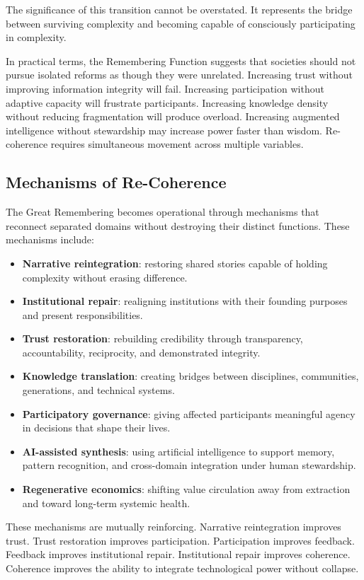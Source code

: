 \documentclass[12pt]{article}
\begin{document}
The significance of this transition cannot be overstated. It represents the bridge between surviving complexity and becoming capable of consciously participating in complexity.

In practical terms, the Remembering Function suggests that societies should not pursue isolated reforms as though they were unrelated. Increasing trust without improving information integrity will fail. Increasing participation without adaptive capacity will frustrate participants. Increasing knowledge density without reducing fragmentation will produce overload. Increasing augmented intelligence without stewardship may increase power faster than wisdom. Re-coherence requires simultaneous movement across multiple variables.

\subsection{Mechanisms of Re-Coherence}

The Great Remembering becomes operational through mechanisms that reconnect separated domains without destroying their distinct functions. These mechanisms include:

\begin{itemize}
  \item \textbf{Narrative reintegration}: restoring shared stories capable of holding complexity without erasing difference.
  \item \textbf{Institutional repair}: realigning institutions with their founding purposes and present responsibilities.
  \item \textbf{Trust restoration}: rebuilding credibility through transparency, accountability, reciprocity, and demonstrated integrity.
  \item \textbf{Knowledge translation}: creating bridges between disciplines, communities, generations, and technical systems.
  \item \textbf{Participatory governance}: giving affected participants meaningful agency in decisions that shape their lives.
  \item \textbf{AI-assisted synthesis}: using artificial intelligence to support memory, pattern recognition, and cross-domain integration under human stewardship.
  \item \textbf{Regenerative economics}: shifting value circulation away from extraction and toward long-term systemic health.
\end{itemize}

These mechanisms are mutually reinforcing. Narrative reintegration improves trust. Trust restoration improves participation. Participation improves feedback. Feedback improves institutional repair. Institutional repair improves coherence. Coherence improves the ability to integrate technological power without collapse.
\end{document}

